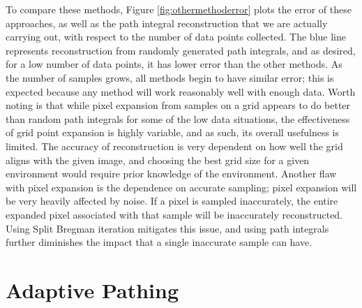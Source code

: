 \documentclass[english]{article}\usepackage[]{graphicx}\usepackage[]{color}
\begin{document}
To compare these methods, Figure \ref{fig:othermethoderror} plots the error of these approaches, as well as the path integral reconstruction that we are actually carrying out, with respect to the number of data points collected. The blue line represents reconstruction from randomly generated path integrals, and as desired, for a low number of data points, it has lower error than the other methods. As the number of samples grows, all methods begin to have similar error; this is expected because any method will work reasonably well with enough data. Worth noting is that while pixel expansion from samples on a grid appears to do better than random path integrals for some of the low data situations, the effectiveness of grid point expansion is highly variable, and as such, its overall usefulness is limited. The accuracy of reconstruction is very dependent on how well the grid aligns with the given image, and choosing the best grid size for a given environment would require prior knowledge of the environment. Another flaw with pixel expansion is the dependence on accurate sampling; pixel expansion will be very heavily affected by noise. If a pixel is sampled inaccurately, the entire expanded pixel associated with that sample will be inaccurately reconstructed. Using Split Bregman iteration mitigates this issue, and using path integrals further diminishes the impact that a single inaccurate sample can have.


\section{Adaptive Pathing}

\end{document}
